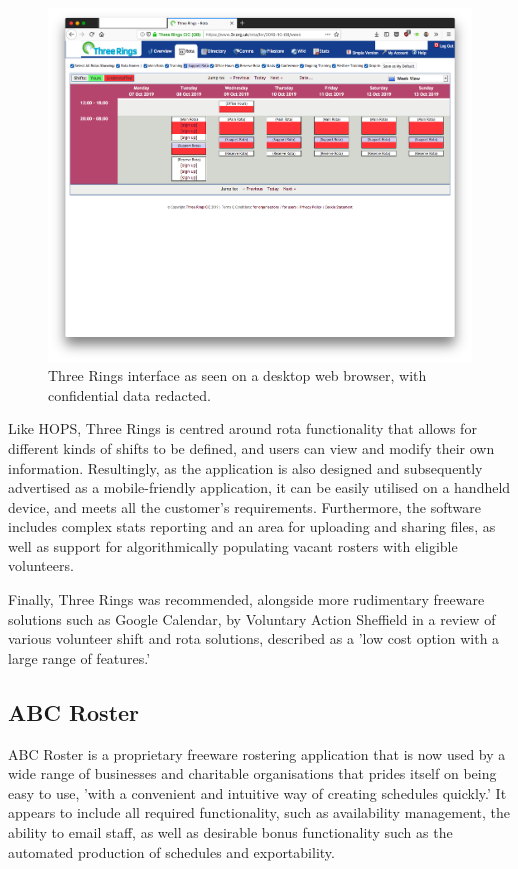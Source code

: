 \begin{figure}[!ht]
    \includegraphics[width=\textwidth]{Figures/3r}
    \caption{Three Rings interface as seen on a desktop web browser, with confidential data redacted.}
    \label{fig:3r}
\end{figure}

Like HOPS, Three Rings is centred around rota functionality that allows for different kinds of shifts to be defined, and users can view and modify their own information. Resultingly, as the application is also designed and subsequently advertised as a mobile-friendly application, it can be easily utilised on a handheld device, and meets all the customer's requirements. Furthermore, the software includes complex stats reporting and an area for uploading and sharing files, as well as support for algorithmically populating vacant rosters with eligible volunteers. \cite{3r3} \cite{3r2}

Finally, Three Rings was recommended, alongside more rudimentary freeware solutions such as Google Calendar, by Voluntary Action Sheffield in a review of various volunteer shift and rota solutions, described as a 'low cost option with a large range of features.' \cite{SVC1}

\subsection{ABC Roster} 

ABC Roster is a proprietary freeware rostering application that is now used by a wide range of businesses and charitable organisations that prides itself on being easy to use, 'with a convenient and intuitive way of creating schedules quickly.' It appears to include all required functionality, such as availability management, the ability to email staff, as well as desirable bonus functionality such as the automated production of schedules and exportability. \cite{ABC1}


